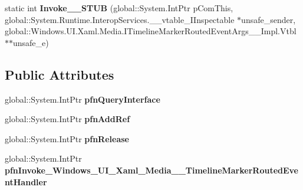 \begin{DoxyCompactItemize}
\item 
\mbox{\label{struct_windows_1_1_u_i_1_1_xaml_1_1_media_1_1_timeline_marker_routed_event_handler_____impl_1_1_vtbl_a3402b7d67c9165005ca84070a144112d}} 
static int {\bfseries Invoke\+\_\+\+\_\+\+S\+T\+UB} (global\+::\+System.\+Int\+Ptr p\+Com\+This, global\+::\+System.\+Runtime.\+Interop\+Services.\+\_\+\+\_\+vtable\+\_\+\+I\+Inspectable $\ast$unsafe\+\_\+sender, global\+::\+Windows.\+U\+I.\+Xaml.\+Media.\+I\+Timeline\+Marker\+Routed\+Event\+Args\+\_\+\+\_\+\+Impl.\+Vtbl $\ast$$\ast$unsafe\+\_\+e)
\end{DoxyCompactItemize}
\subsection*{Public Attributes}
\begin{DoxyCompactItemize}
\item 
\mbox{\label{struct_windows_1_1_u_i_1_1_xaml_1_1_media_1_1_timeline_marker_routed_event_handler_____impl_1_1_vtbl_ab56930e95c728fe3377ecd3eb1c75a1e}} 
global\+::\+System.\+Int\+Ptr {\bfseries pfn\+Query\+Interface}
\item 
\mbox{\label{struct_windows_1_1_u_i_1_1_xaml_1_1_media_1_1_timeline_marker_routed_event_handler_____impl_1_1_vtbl_a355737dec8f934b1ac0dddd84eae28cd}} 
global\+::\+System.\+Int\+Ptr {\bfseries pfn\+Add\+Ref}
\item 
\mbox{\label{struct_windows_1_1_u_i_1_1_xaml_1_1_media_1_1_timeline_marker_routed_event_handler_____impl_1_1_vtbl_a3db997d99085514cd3b275f423e5354b}} 
global\+::\+System.\+Int\+Ptr {\bfseries pfn\+Release}
\item 
\mbox{\label{struct_windows_1_1_u_i_1_1_xaml_1_1_media_1_1_timeline_marker_routed_event_handler_____impl_1_1_vtbl_a9a97eb98c835ca59c13f1614c4508774}} 
global\+::\+System.\+Int\+Ptr {\bfseries pfn\+Invoke\+\_\+\+Windows\+\_\+\+U\+I\+\_\+\+Xaml\+\_\+\+Media\+\_\+\+\_\+\+Timeline\+Marker\+Routed\+Event\+Handler}
\end{DoxyCompactItemize}
